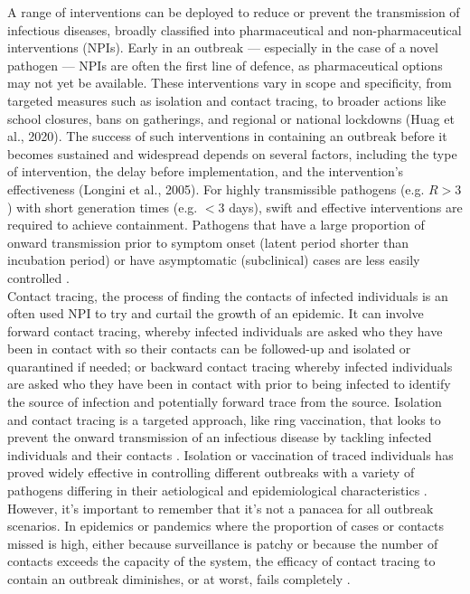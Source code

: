 \documentclass{article}
\begin{document}
A range of interventions can be deployed to reduce or prevent the transmission of infectious diseases, broadly classified into pharmaceutical and non-pharmaceutical interventions (NPIs). Early in an outbreak --- especially in the case of a novel pathogen --- NPIs are often the first line of defence, as pharmaceutical options may not yet be available. These interventions vary in scope and specificity, from targeted measures such as isolation and contact tracing, to broader actions like school closures, bans on gatherings, and regional or national lockdowns (Huag et al., 2020). The success of such interventions in containing an outbreak before it becomes sustained and widespread depends on several factors, including the type of intervention, the delay before implementation, and the intervention’s effectiveness (Longini et al., 2005). For highly transmissible pathogens (e.g. $R>3$) with short generation times (e.g. $<3$ days), swift and effective interventions are required to achieve containment. Pathogens that have a large proportion of onward transmission prior to symptom onset (latent period shorter than incubation period) or have asymptomatic (subclinical) cases are less easily controlled \citep{fraserFactorsThatMake2004}. \\

Contact tracing, the process of finding the contacts of infected individuals is an often used NPI to try and curtail the growth of an epidemic. It can involve forward contact tracing, whereby infected individuals are asked who they have been in contact with so their contacts can be followed-up and isolated or quarantined if needed; or backward contact tracing whereby infected individuals are asked who they have been in contact with prior to being infected to identify the source of infection and potentially forward trace from the source. Isolation and contact tracing is a targeted approach, like ring vaccination, that looks to prevent the onward transmission of an infectious disease by tackling infected individuals and their contacts \citep{kucharskiEffectivenessRingVaccination2016, ferrettiQuantifyingSARSCoV2Transmission2020, keelingEfficacyContactTracing2020, whittakerQuantifyingImpactBroadly2024}. Isolation or vaccination of traced individuals has proved widely effective in controlling different outbreaks with a variety of pathogens differing in their aetiological and epidemiological characteristics \citep{foegeSELECTIVEEPIDEMIOLOGICCONTROL1971, bellPublicHealthInterventions2004}. However, it's important to remember that it's not a panacea for all outbreak scenarios. In epidemics or pandemics where the proportion of cases or contacts missed is high, either because surveillance is patchy or because the number of contacts exceeds the capacity of the system, the efficacy of contact tracing to contain an outbreak diminishes, or at worst, fails completely \citep{dhillonWhenContactTracing2018, hellewellFeasibilityControllingCOVID192020}. \\
\end{document}
